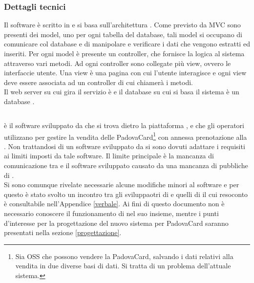 \subsubsection{Dettagli tecnici}
Il software è scritto in  e si basa sull'architettura . Come previsto da MVC sono presenti dei model, uno per ogni tabella del database, tali model si occupano di comunicare col database e di manipolare e verificare i dati che vengono estratti ed inseriti.
Per ogni model è presente un controller, che fornisce la logica al sistema attraverso vari metodi. Ad ogni controller sono collegate più view, ovvero le interfaccie utente. Una view è una pagina con cui l'utente interagisce e ogni view deve essere associata ad un controller di cui chiamerà i metodi.\\

Il web server su cui gira il servizio è  e il database su cui si basa il sistema è un database .



\subsection{\tlite}
\tlite è il software sviluppato da \glossario{\charta} che si trova dietro la piattaforma \glossario{\vivaticket}, e che gli operatori utilizzano per gestire la vendita delle PadovaCard\footnote{Sia OSS che \tlite possono vendere la PadovaCard, salvando i dati relativi alla vendita in due diverse basi di dati. Si tratta di un problema dell'attuale sistema.} con annessa prenotazione alla \cappella.
Non trattandosi di un software sviluppato da \net si sono dovuti adattare i requisiti ai limiti imposti da tale software.
Il limite principale è la mancanza di comunicazione tra \tlite e il software sviluppato causato da una mancanza di  pubbliche di \tlite.\\

Si sono comunque rivelate necessarie alcune modifiche minori al software e per questo è stato svolto un incontro tra gli sviluppaotri di \tlite e quelli di \net il cui resoconto è consultabile nell'Appendice \ref{verbale}.
Ai fini di questo documento non è necessario conoscere il funzionamento di \tlite nel suo insieme, mentre i punti d'interesse per la progettazione del nuovo sistema per PadovaCard saranno presentati nella sezione \ref{progettazione}.

